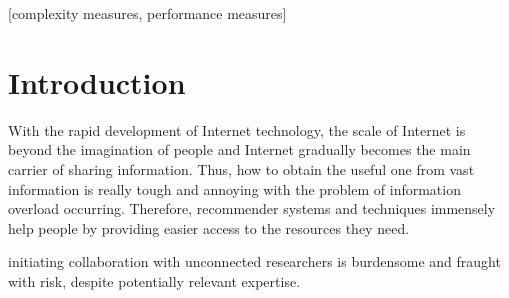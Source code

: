 \documentclass{acm_proc_article-sp}
\begin{document}
\date{30 July 1999}

\maketitle
\begin{abstract}
Due to the expansion of academic research in diverse fields, the problem of finding relevant and potential collaborators has become cumbersome. In this work, we propose an academic collaboration recommendation model called CCRec. CCRec combines publication contents with collaboration networks to effectively generate academic collaboration recommendation for researchers. Using the DBLP data sets, we conduct benchmarking experiments to examine the performance of CCRec. Our preliminary experimental results show that CCRec outperforms other state-of-the-art methods especially in addressing the topic drift problems.
\end{abstract}

[complexity measures, performance measures]



\section{Introduction}
With the rapid development of Internet technology, the scale of Internet is beyond the imagination of people and Internet gradually becomes the main carrier of sharing information. Thus, how to obtain the useful one from vast information is really tough and annoying with the problem of information overload occurring. Therefore, recommender systems and techniques immensely help people by providing easier access to the resources they need.

initiating collaboration with unconnected researchers is burdensome and fraught with risk, despite potentially relevant expertise.
\end{document}
